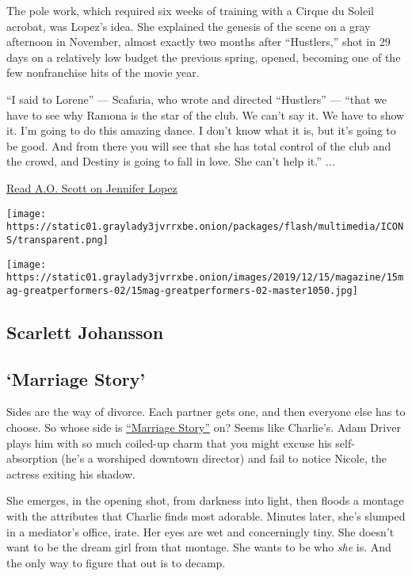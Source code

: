 The pole work, which required six weeks of training with a Cirque du
Soleil acrobat, was Lopez's idea. She explained the genesis of the scene
on a gray afternoon in November, almost exactly two months after
``Hustlers,'' shot in 29 days on a relatively low budget the previous
spring, opened, becoming one of the few nonfranchise hits of the movie
year.

``I said to Lorene'' --- Scafaria, who wrote and directed ``Hustlers''
--- ``that we have to see why Ramona is the star of the club. We can't
say it. We have to show it. I'm going to do this amazing dance. I don't
know what it is, but it's going to be good. And from there you will see
that she has total control of the club and the crowd, and Destiny is
going to fall in love. She can't help it.'' \emph{...}

\href{https://www.nytimes3xbfgragh.onion/interactive/2019/12/09/magazine/jennifer-lopez-hustlers.html}{Read
A.O. Scott on Jennifer Lopez}

\texttt{[image: https://static01.graylady3jvrrxbe.onion/packages/flash/multimedia/ICONS/transparent.png]}

\texttt{[image: https://static01.graylady3jvrrxbe.onion/images/2019/12/15/magazine/15mag-greatperformers-02/15mag-greatperformers-02-master1050.jpg]}

\hypertarget{scarlett-johansson}{%
\subsection{Scarlett Johansson}\label{scarlett-johansson}}

\hypertarget{marriage-story-1}{%
\subsection{`Marriage Story'}\label{marriage-story-1}}

Sides are the way of divorce. Each partner gets one, and then everyone
else has to choose. So whose side is
\href{https://www.nytimes3xbfgragh.onion/2019/11/05/movies/marriage-story-review.html}{``Marriage
Story''} on? Seems like Charlie's. Adam Driver plays him with so much
coiled-up charm that you might excuse his self-absorption (he's a
worshiped downtown director) and fail to notice Nicole, the actress
exiting his shadow.

She emerges, in the opening shot, from darkness into light, then floods
a montage with the attributes that Charlie finds most adorable. Minutes
later, she's slumped in a mediator's office, irate. Her eyes are wet and
concerningly tiny. She doesn't want to be the dream girl from that
montage. She wants to be who \emph{she} is. And the only way to figure
that out is to decamp.

